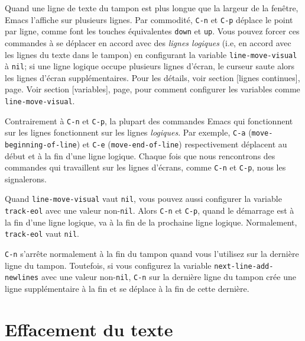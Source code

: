 Quand une ligne de texte du tampon est plus longue que la largeur de
la fenêtre, Emacs l'affiche sur plusieurs lignes. Par commodité,
\texttt{C-n} et \texttt{C-p} déplace le point par ligne, comme font
les touches équivalentes \texttt{down} et \texttt{up}. Vous pouvez
forcer ces commandes à se déplacer en accord avec des \emph{lignes
  logiques} (i.e, en accord avec les lignes du texte dans le tampon)
en configurant la variable \texttt{line-move-visual} à \texttt{nil};
si une ligne logique occupe plusieurs lignes d'écran, le curseur saute
alors les lignes d'écran supplémentaires. Pour les détails, voir
section [lignes continues], page. Voir
section [variables], page, pour comment
configurer les variables comme \texttt{line-move-visual}.\par

Contrairement à \texttt{C-n} et \texttt{C-p}, la plupart des commandes
Emacs qui fonctionnent sur les lignes fonctionnent sur les lignes
\emph{logiques}. Par exemple, \texttt{C-a}
(\texttt{move-beginning-of-line}) et \texttt{C-e}
(\texttt{move-end-of-line}) respectivement déplacent au début et à la
fin d'une ligne logique. Chaque fois que nous rencontrons des
commandes qui travaillent sur les lignes d'écrans, comme \texttt{C-n}
et \texttt{C-p}, nous les signalerons.\par

Quand \texttt{line-move-visual} vaut \texttt{nil}, vous pouvez aussi
configurer la variable \texttt{track-eol} avec une valeur
non-\texttt{nil}. Alors \texttt{C-n} et \texttt{C-p}, quand le
démarrage est à la fin d'une ligne logique, va à la fin de la
prochaine ligne logique. Normalement, \texttt{track-eol} vaut
\texttt{nil}.\par

\texttt{C-n} s'arrête normalement à la fin du tampon quand vous
l'utilisez sur la dernière ligne du tampon. Toutefois, si vous
configurez la variable \texttt{next-line-add-newlines} avec une
valeur non-\texttt{nil}, \texttt{C-n} sur la dernière ligne du tampon
crée une ligne supplémentaire à la fin et se déplace à la fin de cette dernière.



\section{Effacement du texte}

